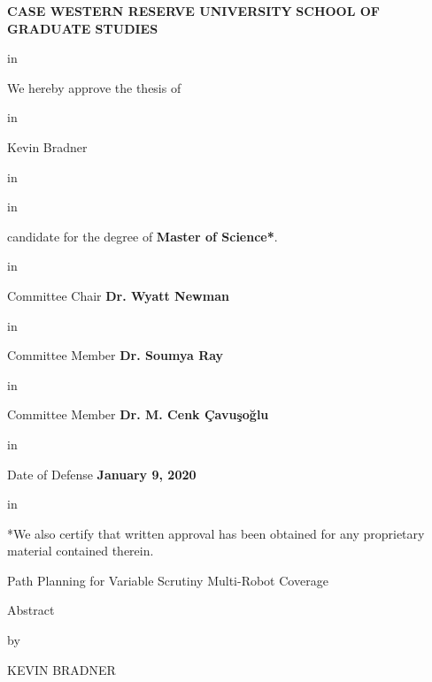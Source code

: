 \begin{center}
\begin{Large}
\textbf{CASE WESTERN RESERVE UNIVERSITY}
\linebreak
\textbf{SCHOOL OF GRADUATE STUDIES}
\end{Large}

 in

We hereby approve the thesis of

 in

\begin{Large}
Kevin Bradner
\end{Large}

 in

 in

candidate for the degree of \textbf{Master of Science*}.

 in

Committee Chair
\linebreak
\textbf{Dr. Wyatt Newman}

 in

Committee Member
\linebreak
\textbf{Dr. Soumya Ray}

 in

Committee Member
\linebreak
\textbf{Dr. M. Cenk {\c C}avu{\c s}o{\u g}lu}

 in

Date of Defense
\linebreak
\textbf{January 9, 2020}

 in

*We also certify that written approval has been obtained
\linebreak
for any proprietary material contained therein.

\end{center}


\tableofcontents

\listoftables

\listoffigures

\pagebreak

\begin{center}

Path Planning for Variable Scrutiny Multi-Robot Coverage

Abstract

by

KEVIN BRADNER

\end{center}

